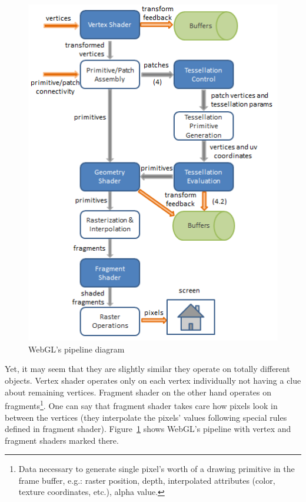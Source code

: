 \begin{figure}
	\vspace*{-0.65in}
	\hspace*{1em}
	\includegraphics[height=0.47\textheight,keepaspectratio]{webgl_pipeline.png}
	\caption{WebGL's pipeline diagram~\cite{lighthouse3d_pipeline}}
	\label{fig:webgl_pipeline}
\end{figure}
\vspace{1pc}

Yet, it may seem that they are slightly similar they operate on totally different objects.
\newline Vertex shader operates only on each vertex individually not having a clue about remaining vertices.
\newline Fragment shader on the other hand operates on fragments\footnote{Data necessary to generate single pixel's worth of a drawing primitive in the frame buffer, e.g.: raster position, depth, interpolated attributes (color, texture coordinates, etc.), alpha value.}.
One can say that fragment shader takes care how pixels look in between the vertices (they interpolate the pixels' values following special rules defined in fragment shader).
Figure~\ref{fig:webgl_pipeline} shows WebGL's pipeline with vertex and fragment shaders marked there.

